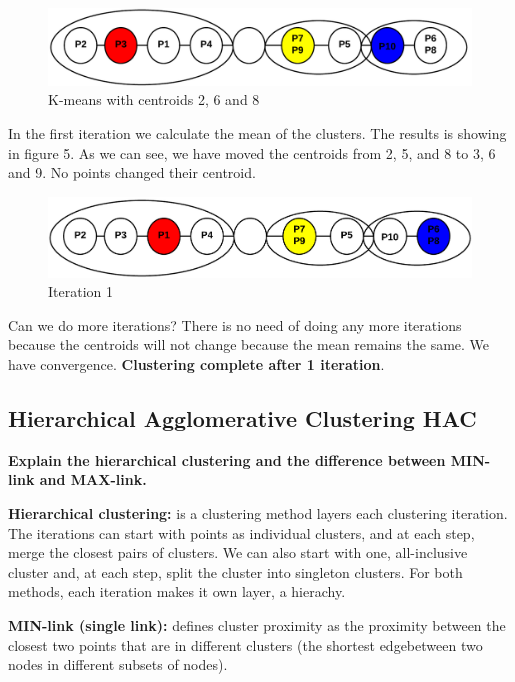 	\begin{figure}[H]
		\includegraphics[width=\textwidth]{pics/clustering2.png}	
		\caption{K-means with centroids 2, 6 and 8}
	\end{figure}

	In the first iteration we calculate the mean of the clusters. The results is
	showing in figure 5. As we can see, we have moved the centroids from 2, 5, and 8 to 
	3, 6 and 9. No points changed their centroid. 

	\begin{figure}[H]
		\includegraphics[width=\textwidth]{pics/clustering4.png}	
		\caption{Iteration 1}
	\end{figure}

	Can we do more iterations? There is no need of doing any more iterations because
	the centroids will not change because the mean remains the same. 
	We have convergence. {\bf Clustering complete after 1 iteration}.

	\clearpage
	\subsection{Hierarchical Agglomerative Clustering HAC}

		{\bf Explain the hierarchical clustering and the difference between MIN-link
		and MAX-link.}

		\noindent\makebox[\linewidth]{\rule{\textwidth}{1pt}} 

		{\bf Hierarchical clustering:} is a clustering method layers each clustering iteration.
		The iterations can start with points as individual clusters, and at each step, merge
		the closest pairs of clusters. We can also start with one, all-inclusive cluster and, 
		at each step, split the cluster into singleton clusters. For both methods, each
		iteration makes it own layer, a hierachy.

		{\bf MIN-link (single link):} defines cluster proximity as the proximity between the closest two points
		that are in different clusters (the shortest edgebetween two nodes in different subsets
		of nodes).

